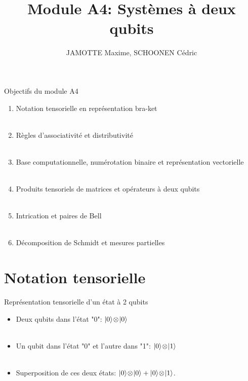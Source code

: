 \documentclass[aspectratio=169,12pt]{beamer}
\title[Module A4]{Module A4: Systèmes à deux qubits}
\author{JAMOTTE Maxime, SCHOONEN Cédric}
\institute{Digital Learning Hub}
\date{}
\begin{document}
\begin{frame}
  \titlepage
\end{frame}

\begin{frame}{Objectifs du module A4}
  \begin{enumerate}[<+->]
    \item Notation tensorielle en représentation bra-ket
    \\~\\
    \item Règles d'associativité et distributivité
    \\~\\
    \item Base computationnelle, numérotation binaire et représentation vectorielle
    \\~\\
    \item Produits tensoriels de matrices et opérateurs à deux qubits
    \\~\\
    \item Intrication et paires de Bell
    \\~\\
    \item Décomposition de Schmidt et mesures partielles
  \end{enumerate}
\end{frame}

\section{Notation tensorielle}

\begin{frame}{Représentation tensorielle d'un état à 2 qubits}
  \begin{itemize}[<+->]
    \item Deux qubits dans l'état "0": $\ket{0}\!\otimes\!\ket{0}$
    \\~\\
    \item Un qubit dans l'état "0" et l'autre dans "1": $\ket{0}\!\otimes\!\ket{1}$
    \\~\\
    \item Superposition de ces deux états: $\ket{0}\!\otimes\!\ket{0} + \ket{0}\!\otimes\!\ket{1}$.
  \end{itemize}
\end{frame}
\end{document}
